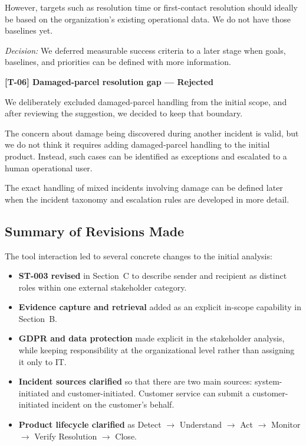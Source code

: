 \documentclass[11pt,a4paper]{article}
\begin{document}
However, targets such as resolution time or first-contact
resolution should ideally be based on the organization's existing
operational data. We do not have those baselines yet.

\textit{Decision:} We deferred measurable success criteria to a
later stage when goals, baselines, and priorities can be defined
with more information.

\textbf{[T-06] Damaged-parcel resolution gap --- Rejected}

We deliberately excluded damaged-parcel handling from the initial
scope, and after reviewing the suggestion, we decided to keep that
boundary.

The concern about damage being discovered during another incident
is valid, but we do not think it requires adding damaged-parcel
handling to the initial product. Instead, such cases can be
identified as exceptions and escalated to a human operational user.

The exact handling of mixed incidents involving damage can be
defined later when the incident taxonomy and escalation rules are
developed in more detail.

\subsection{Summary of Revisions Made}

The tool interaction led to several concrete changes to the initial
analysis:

\begin{itemize}

    \item \textbf{ST-003 revised} in Section~C to describe sender
    and recipient as distinct roles within one external stakeholder
    category.

    \item \textbf{Evidence capture and retrieval} added as an
    explicit in-scope capability in Section~B.

    \item \textbf{GDPR and data protection} made explicit in the
    stakeholder analysis, while keeping responsibility at the
    organizational level rather than assigning it only to IT.

    \item \textbf{Incident sources clarified} so that there are two
    main sources: system-initiated and customer-initiated. Customer
    service can submit a customer-initiated incident on the
    customer's behalf.

    \item \textbf{Product lifecycle clarified} as
    Detect $\rightarrow$ Understand $\rightarrow$ Act
    $\rightarrow$ Monitor $\rightarrow$ Verify Resolution
    $\rightarrow$ Close.

\end{itemize}
\end{document}
